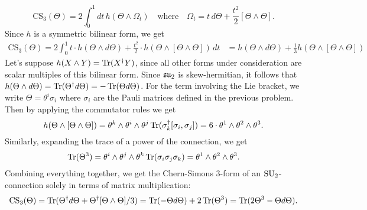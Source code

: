 \documentclass{../../templates/lkx_pset}
\begin{document}
\begin{parts}
	\[
		\textrm{CS}_3(\Theta) = 2\int_0^1 dt\,h(\Theta \wedge \Omega_t)\quad\textrm{where}\quad \Omega_t = t\,d\Theta + \frac{t^2}{2}[\Theta\wedge \Theta].
	\]
	Since $h$ is a symmetric bilinear form, we get
	\[
		\begin{aligned}
		\textrm{CS}_3(\Theta) = 2\int_0^1 t\cdot h(\Theta\wedge d\Theta) + \frac{t^2}{2}\cdot h\left(\Theta\wedge[\Theta\wedge\Theta]\right)\,dt 
		&= h(\Theta\wedge d\Theta) + \frac{1}{3}h(\Theta\wedge [\Theta\wedge \Theta])
		\end{aligned}
	\]
	Let's suppose $h(X\wedge Y)=\operatorname{Tr}(X^\dagger Y)$, since all other forms under consideration are scalar multiples of this bilinear form. Since $\mathfrak{su}_2$ is skew-hermitian, it follows that $h(\Theta\wedge d\Theta) = \operatorname{Tr}(\Theta^\dagger d\Theta)= - \operatorname{Tr}(\Theta d\Theta)$. For the term involving the Lie bracket, we write $\Theta = \theta^i\sigma_i$ where $\sigma_i$ are the Pauli matrices defined in the previous problem. Then by applying the commutator rules we get
	\[
		h(\Theta\wedge [\Theta\wedge \Theta]) = \theta^k\wedge \theta^i\wedge \theta^j\operatorname{Tr}(\sigma_k^\dagger [\sigma_i,\sigma_j]) = 6\cdot \theta^1\wedge \theta^2\wedge \theta^3.
	\]
	Similarly, expanding the trace of a power of the connection, we get
	\[
		\operatorname{Tr}(\Theta^3) = \theta^i\wedge\theta^j\wedge \theta^k\operatorname{Tr}(\sigma_i\sigma_j\sigma_k) = \theta^1\wedge \theta^2\wedge \theta^3.
	\]
	Combining everything together, we get the Chern-Simons $3$-form of an $\operatorname{SU}_2$-connection solely in terms of matrix multiplication:
	\[
		\textrm{CS}_3(\Theta) = \operatorname{Tr}(\Theta^\dagger d\Theta + \Theta^\dagger[\Theta\wedge\Theta]/3) =
		\operatorname{Tr}(-\Theta d\Theta) + 2\operatorname{Tr}(\Theta^3)=
		\operatorname{Tr}(2\Theta^3-\Theta d\Theta).
	\]



\end{parts}
\end{document}
